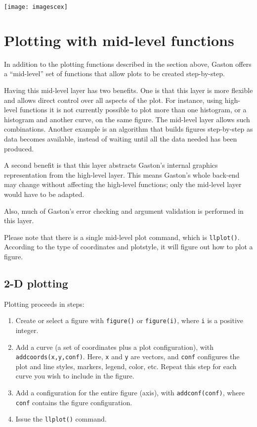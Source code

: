 \documentclass[11pt]{article}
\newcommand{\cmd}[1]{\texttt{#1}}
\begin{document}
\begin{center}
	\texttt{[image: imagescex]}
\end{center}

\section{Plotting with mid-level functions}
\label{midlevel}

In addition to the plotting functions described in the section above, Gaston
offers a ``mid-level'' set of functions that allow plots to be created
step-by-step.

Having this mid-level layer has two benefits. One is that this layer is more
flexible and allows direct control over all aspects of the plot. For instance,
using high-level functions it is not currently possible to plot more than one
histogram, or a histogram and another curve, on the same figure. The mid-level
layer allows such combinations. Another example is an algorithm that builds
figures step-by-step as data becomes available, instead of waiting until all
the data needed has been produced.

A second benefit is that this layer abstracts Gaston's internal graphics
representation from the high-level layer. This means Gaston's whole back-end
may change without affecting the high-level functions; only the mid-level layer
would have to be adapted.

Also, much of Gaston's error checking and argument validation is performed in
this layer.

Please note that there is a single mid-level plot command, which is
\cmd{llplot()}. According to the type of coordinates and plotstyle, it will
figure out how to plot a figure.

\subsection{2-D plotting}

Plotting proceeds in steps:
\begin{enumerate}
	\item Create or select a figure with \cmd{figure()} or \cmd{figure(i)},
		where \cmd{i} is a positive integer.
	\item Add a curve (a set of coordinates plus a plot configuration), with
		\cmd{addcoords(x,y,conf)}. Here, \cmd{x} and \cmd{y} are vectors, and
		\cmd{conf} configures the plot and line styles, markers, legend, color,
		etc. Repeat this step for each curve you wish to include
		in the figure.
	\item Add a configuration for the entire figure (axis), with
		\cmd{addconf(conf)}, where \cmd{conf} contains the figure
		configuration.
	\item Issue the \cmd{llplot()} command.
\end{enumerate}
\end{document}
